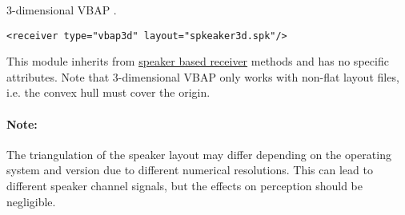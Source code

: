 3-dimensional VBAP \cite{Pulkki1997}.

\begin{lstlisting}[numbers=none]
<receiver type="vbap3d" layout="spkeaker3d.spk"/>
\end{lstlisting}

%

This module inherits from \hyperref[attrtab:speakerbased]{speaker based receiver} methods and has no specific attributes. Note that 3-dimensional VBAP only works with non-flat layout files, i.e. the convex hull must cover the origin.

\paragraph{Note:} The triangulation of the speaker layout may differ depending on the operating system and version due to different numerical resolutions. This can lead to different speaker channel signals, but the effects on perception should be negligible.
